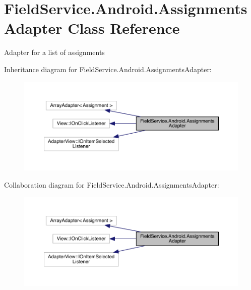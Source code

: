 \hypertarget{class_field_service_1_1_android_1_1_assignments_adapter}{\section{Field\+Service.\+Android.\+Assignments\+Adapter Class Reference}
\label{class_field_service_1_1_android_1_1_assignments_adapter}
}


Adapter for a list of assignments  




Inheritance diagram for Field\+Service.\+Android.\+Assignments\+Adapter\+:
\nopagebreak
\begin{figure}[H]
\begin{center}
\leavevmode
\includegraphics[width=350pt]{class_field_service_1_1_android_1_1_assignments_adapter__inherit__graph}
\end{center}
\end{figure}


Collaboration diagram for Field\+Service.\+Android.\+Assignments\+Adapter\+:
\nopagebreak
\begin{figure}[H]
\begin{center}
\leavevmode
\includegraphics[width=350pt]{class_field_service_1_1_android_1_1_assignments_adapter__coll__graph}
\end{center}
\end{figure}
